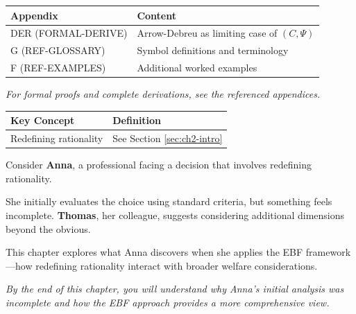 \begin{tcolorbox}[
    colback=yellow!10!white,
    colframe=orange!75!black,
    title={\textbf{Appendix References for This Chapter}},
    fonttitle=\bfseries
]
\small
\begin{tabular}{@{}lp{8cm}@{}}
\textbf{Appendix} & \textbf{Content} \\
\midrule
DER (FORMAL-DERIVE) & Arrow-Debreu as limiting case of $(C, \Psi)$ \\
G (REF-GLOSSARY) & Symbol definitions and terminology \\
F (REF-EXAMPLES) & Additional worked examples \\
\end{tabular}

\medskip
\textit{For formal proofs and complete derivations, see the referenced appendices.}
\end{tcolorbox}

\begin{tcolorbox}[
    colback=gray!5!white,
    colframe=gray!75!black,
    title={\textbf{Begriffe in diesem Kapitel}},
    fonttitle=\bfseries
]
\small
\begin{tabular}{@{}ll@{}}
\textbf{Key Concept} & \textbf{Definition} \\
\midrule
Redefining rationality & See Section \ref{sec:ch2-intro} \\
\end{tabular}
\end{tcolorbox}



\begin{tcolorbox}[
    colback=blue!5!white,
    colframe=blue!75!black,
    title={\textbf{Intuition: A Motivating Example}},
    fonttitle=\bfseries
]
Consider \textbf{Anna}, a professional facing a decision that involves redefining rationality.

She initially evaluates the choice using standard criteria, but something feels incomplete.
\textbf{Thomas}, her colleague, suggests considering additional dimensions beyond the obvious.

This chapter explores what Anna discovers when she applies the EBF framework---how
redefining rationality interact with broader welfare considerations.

\medskip
\textit{By the end of this chapter, you will understand why Anna's initial analysis
was incomplete and how the EBF approach provides a more comprehensive view.}
\end{tcolorbox}




